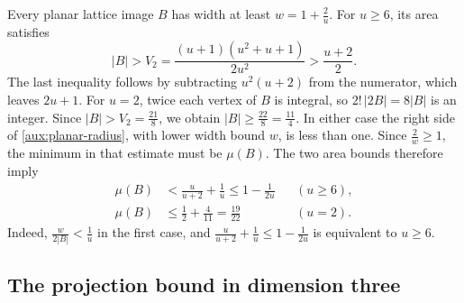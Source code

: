 \documentclass[reqno, 11pt]{article}
\numberwithin{equation}{section}
\theoremstyle{definition}
\begin{document}
Every planar lattice image $B$ has width at least $w=1+\frac{2}{u}$.
For $u\ge6$, its area satisfies
\[
 |B|>V_2=\frac{(u+1)(u^2+u+1)}{2u^2}>\frac{u+2}{2}.
\]
The last inequality follows by subtracting $u^2(u+2)$ from the
numerator, which leaves $2u+1$. For $u=2$, twice each vertex of $B$
is integral, so $2!\,|2B|=8|B|$ is an integer. Since $|B|>V_2=\frac{21}{8}$,
we obtain $|B|\ge\frac{22}{8}=\frac{11}{4}$. In either case the right
side of \eqref{aux:planar-radius}, with lower width bound $w$, is less
than one. Since $\frac{2}{w}\ge1$, the minimum in that estimate must be
$\mu(B)$. The two area bounds therefore imply
\begin{equation}\label{eq:rat-planar-radius}
 \begin{aligned}
 \mu(B)&<\frac{u}{u+2}+\frac{1}{u}\le1-\frac{1}{2u} &&(u\ge6),\\
 \mu(B)&\le\frac{1}{2}+\frac{4}{11}=\frac{19}{22} &&(u=2).
 \end{aligned}
\end{equation}
Indeed, $\frac{w}{2|B|}<\frac{1}{u}$ in the first case, and
$\frac{u}{u+2}+\frac{1}{u}\le1-\frac{1}{2u}$ is equivalent to $u\ge6$.

\subsection{The projection bound in dimension three}
\end{document}
